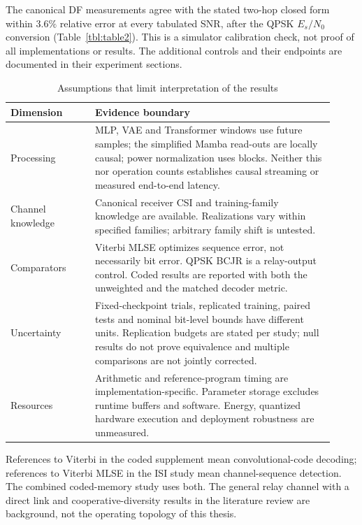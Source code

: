 The canonical DF measurements agree with the stated two-hop closed form within $3.6\%$ relative error at every tabulated SNR, after the QPSK $E_s/N_0$ conversion (Table~\ref{tbl:table2}). This is a simulator calibration check, not proof of all implementations or results. The additional controls and their endpoints are documented in their experiment sections.

\begin{longtable}{@{}p{0.24\linewidth}p{0.68\linewidth}@{}}
\caption[Assumptions and evidence boundaries]{Assumptions that limit interpretation of the results}\label{tbl:assumptions-claims}\\
\toprule
Dimension & Evidence boundary\\
\midrule
Processing & MLP, VAE and Transformer windows use future samples; the simplified Mamba read-outs are locally causal; power normalization uses blocks. Neither this nor operation counts establishes causal streaming or measured end-to-end latency.\\
Channel knowledge & Canonical receiver CSI and training-family knowledge are available. Realizations vary within specified families; arbitrary family shift is untested.\\
Comparators & Viterbi MLSE optimizes sequence error, not necessarily bit error. QPSK BCJR is a relay-output control. Coded results are reported with both the unweighted and the matched decoder metric.\\
Uncertainty & Fixed-checkpoint trials, replicated training, paired tests and nominal bit-level bounds have different units. Replication budgets are stated per study; null results do not prove equivalence and multiple comparisons are not jointly corrected.\\
Resources & Arithmetic and reference-program timing are implementation-specific. Parameter storage excludes runtime buffers and software. Energy, quantized hardware execution and deployment robustness are unmeasured.\\
\bottomrule
\end{longtable}

References to Viterbi in the coded supplement mean convolutional-code decoding; references to Viterbi MLSE in the ISI study mean channel-sequence detection. The combined coded-memory study uses both. The general relay channel with a direct link and cooperative-diversity results in the literature review are background, not the operating topology of this thesis.

